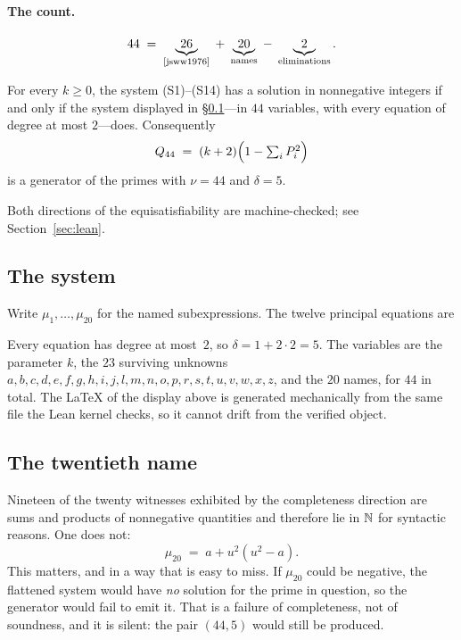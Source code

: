 \paragraph{The count.}
\[
  44 \;=\; \underbrace{26}_{\text{\cite{jsww1976}}}
        \;+\; \underbrace{20}_{\text{names}}
        \;-\; \underbrace{2}_{\text{eliminations}} .
\]

\begin{theorem}
\label{thm:deg5}
For every $k\ge0$, the system \textup{(S1)--(S14)} has a solution in
nonnegative integers if and only if the system displayed in
\S\ref{ssec:flat-system}---in $44$ variables, with every equation of degree at
most $2$---does. Consequently
\[
  Q_{44} \;=\; (k+2)\Bigl(1-\textstyle\sum_i P_i^2\Bigr)
\]
is a generator of the primes with $\nu=44$ and $\delta=5$.
\end{theorem}

Both directions of the equisatisfiability are machine-checked; see
Section~\ref{sec:lean}.

\subsection{The system}
\label{ssec:flat-system}

Write $\mu_1,\dots,\mu_{20}$ for the named subexpressions. The twelve principal
equations are


\noindent
Every equation has degree at most~$2$, so $\delta=1+2\cdot 2=5$. The variables
are the parameter $k$, the $23$ surviving unknowns
$a,b,c,d,e,f,g,h,i,j,l,m,n,o,p,r,s,t,u,v,w,x,z$, and the $20$ names, for $44$ in
total. The \LaTeX{} of the display above is generated mechanically from the
same file the Lean kernel checks, so it cannot drift from the verified object.

\subsection{The twentieth name}

Nineteen of the twenty witnesses exhibited by the completeness direction are
sums and products of nonnegative quantities and therefore lie in $\mathbb{N}$ for
syntactic reasons. One does not:
\[
  \mu_{20} \;=\; a+u^2(u^2-a) .
\]
This matters, and in a way that is easy to miss. If $\mu_{20}$ could be
negative, the flattened system would have \emph{no} solution for the prime in
question, so the generator would fail to emit it. That is a failure of
completeness, not of soundness, and it is silent: the pair $(44,5)$ would still
be produced.

